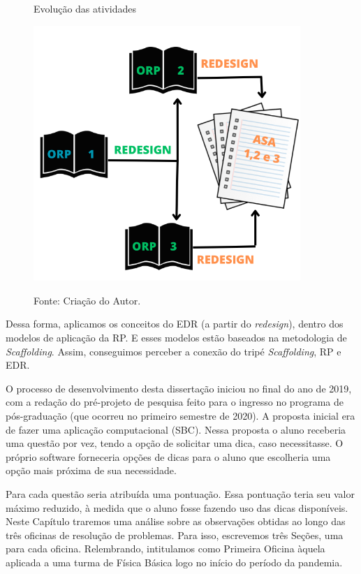 \begin{figure}[htp]
\begin{center}
\caption{Evolução das atividades}
\includegraphics[width=0.9\textwidth]{fig/resumoatovodades.png}
\label{fig:ativEvo}
\caption*{Fonte: Criação do Autor.}
\end{center}
\end{figure}

Dessa forma, aplicamos os conceitos do EDR (a partir do \textit{redesign}), dentro dos modelos de aplicação da RP. E esses modelos estão baseados na metodologia de \textit{Scaffolding}. Assim, conseguimos perceber a conexão do tripé \textit{Scaffolding}, RP e EDR.

O processo de desenvolvimento desta dissertação iniciou no final do ano de 2019, com a redação do pré-projeto de pesquisa feito para o ingresso no programa de pós-graduação (que ocorreu no primeiro semestre de 2020). A proposta inicial era de fazer uma aplicação computacional (SBC). Nessa proposta o aluno receberia uma questão por vez, tendo a opção de solicitar uma dica, caso necessitasse. O próprio software forneceria opções de dicas para o aluno que escolheria uma opção mais próxima de sua necessidade.

Para cada questão seria atribuída uma pontuação. Essa pontuação teria seu valor máximo reduzido, à medida que o aluno fosse fazendo uso das dicas disponíveis. Neste Capítulo traremos uma análise sobre as observações obtidas ao longo das três oficinas de resolução de problemas. Para isso, escrevemos três Seções, uma para cada oficina. Relembrando, intitulamos como Primeira Oficina àquela aplicada a uma turma de Física Básica logo no início do período da pandemia.  

